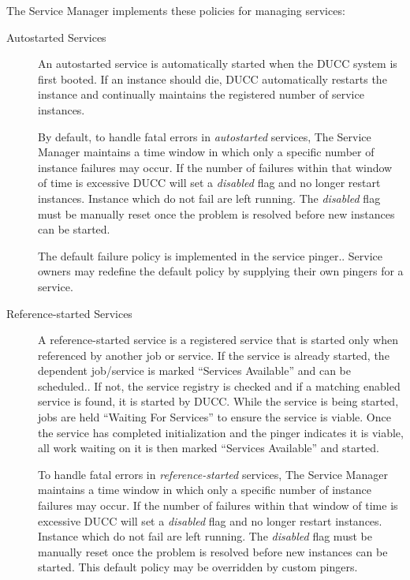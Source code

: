       The Service Manager implements these policies for managing services:
      \begin{description}

         \item[Autostarted Services] An autostarted service is automatically started when the DUCC
           system is first booted.  If an instance should die, DUCC automatically restarts the
           instance and continually maintains the registered number of service instances.

           By default, to handle fatal errors in {\em autostarted} services, The Service Manager maintains a time
           window in which only a specific number of instance failures may occur.  If the number of
           failures within that window of time is excessive DUCC will set a {\em disabled} flag and
           no longer restart instances.  Instance which do not fail are left running.  The {\em
             disabled} flag must be manually reset once the problem is resolved before new instances
           can be started.

           The default failure policy is implemented in the service pinger.. Service
           owners may redefine the default policy by supplying their own pingers for a service.
          
         \item[Reference-started Services] A reference-started service is a registered service that
           is started only when referenced by another job or service. If the service is already
           started, the dependent job/service is marked ``Services Available'' and can be scheduled.. If
           not, the service registry is checked and if a matching enabled service is found, it is 
           started by DUCC.  While the service is being started, jobs are held ``Waiting For Services''
           to ensure the service is viable. Once the service has completed initialization and the pinger 
           indicates it is viable, all work waiting on it is then marked ``Services Available'' and
           started.  
          
           To handle fatal errors in {\em reference-started} services, The Service Manager maintains
           a time window in which only a specific number of instance failures may occur.  If the
           number of failures within that window of time is excessive DUCC will set a {\em disabled}
           flag and no longer restart instances.  Instance which do not fail are left running. The
           {\em disabled} flag must be manually reset once the problem is resolved before new
           instances can be started.  This default policy may be overridden by custom pingers.
           

\end{description}
